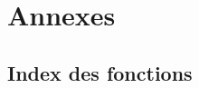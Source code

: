 \documentclass{book}
\begin{document}
%

%
%
%
%
%
%
%
%
%

%
\chapter{Annexes}

\section{Index des fonctions}

\printindex
\end{document}
